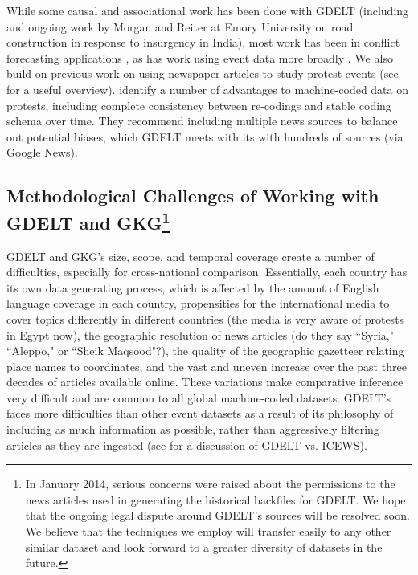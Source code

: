 \documentclass[10pt]{article}
\begin{document}
While some causal and associational work has been done with GDELT (including \citet{gallop2013} and ongoing work by Morgan and Reiter at Emory University on road construction in response to insurgency in India), most work has been in conflict forecasting applications \citep{arva2013,brandt2013,yonamine2013}, as has work using event data more broadly \citep{ward2013, obrien2010crisis}. We also build on previous work on using newspaper articles to study protest events (see \citet{earl2004use} for a useful overview). \citet{earl2004use} identify a number of advantages to machine-coded data on protests, including complete consistency between re-codings and stable coding schema over time. They recommend including multiple news sources to balance out potential biases, which GDELT meets with its  with hundreds of sources (via Google News).

\subsection*{Methodological Challenges of Working with GDELT and GKG\footnote{In January 2014, serious concerns were raised about the permissions to the news articles used in generating the historical backfiles for GDELT. We hope that the ongoing legal dispute around GDELT's sources will be resolved soon. We believe that the techniques we employ will transfer easily to any other similar dataset and look forward to a greater diversity of datasets in the future.}}

GDELT and GKG's size, scope, and temporal coverage create a number of difficulties, especially for cross-national comparison. Essentially, each country has its own data generating process, which is affected by the amount of English language coverage in each country, propensities for the international media to cover topics differently in different countries (the media is very aware of protests in Egypt now), the geographic resolution of news articles (do they say ``Syria," ``Aleppo," or ``Sheik Maqsood"?), the quality of the geographic gazetteer relating place names to coordinates, and the vast and uneven increase over the past three decades of articles available online. These variations make comparative inference very difficult and are common to all global machine-coded datasets. GDELT's faces more difficulties than other event datasets as a result of its philosophy of including as much information as possible, rather than aggressively filtering articles as they are ingested (see \citet{ward2013comparing} for a discussion of GDELT vs. ICEWS).
\end{document}

